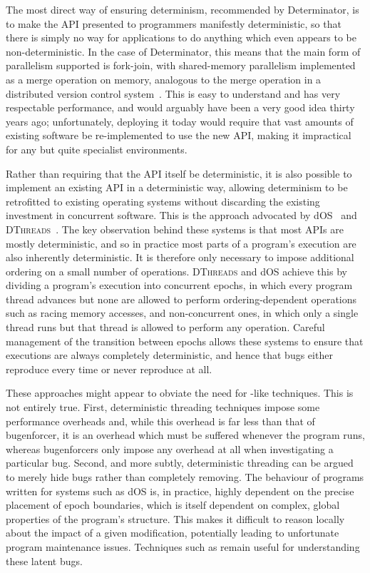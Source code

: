 The most direct way of ensuring determinism, recommended by
Determinator, is to make the API presented to programmers manifestly
deterministic, so that there is simply no way for applications to do
anything which even appears to be non-deterministic.  In the case of
Determinator, this means that the main form of parallelism supported
is fork-join, with shared-memory parallelism implemented as a merge
operation on memory, analogous to the merge operation in a distributed
version control system~\cite{Hamano2013}.  This is easy to understand
and has very respectable performance, and would arguably have been a
very good idea thirty years ago; unfortunately, deploying it today
would require that vast amounts of existing software be re-implemented
to use the new API, making it impractical for any but quite specialist
environments.

Rather than requiring that the API itself be deterministic, it is also
possible to implement an existing API in a deterministic way, allowing
determinism to be retrofitted to existing operating systems without
discarding the existing investment in concurrent software.  This is
the approach advocated by dOS~\cite{Bergan2010} and
\textsc{DThreads}~\cite{Liu2011}.  The key observation behind these
systems is that most APIs are mostly deterministic, and so in practice
most parts of a program's execution are also inherently deterministic.
It is therefore only necessary to impose additional ordering on a
small number of operations.  \textsc{DThreads} and dOS achieve this by
dividing a program's execution into concurrent epochs, in which every
program thread advances but none are allowed to perform
ordering-dependent operations such as racing memory accesses, and
non-concurrent ones, in which only a single thread runs but that
thread is allowed to perform any operation.  Careful management of the
transition between epochs allows these systems to ensure that
executions are always completely deterministic, and hence that bugs
either reproduce every time or never reproduce at all.

These approaches might appear to obviate the need for
{\technique}-like techniques.  This is not entirely true.  First,
deterministic threading techniques impose some performance overheads
and, while this overhead is far less than that of {\atechnique}
\gls{bugenforcer}, it is an overhead which must be suffered whenever
the program runs, whereas \glspl{bugenforcer} only impose any overhead
at all when investigating a particular bug.  Second, and more subtly,
deterministic threading can be argued to merely hide bugs rather than
completely removing.  The behaviour of programs written for systems
such as dOS is, in practice, highly dependent on the precise placement
of epoch boundaries, which is itself dependent on complex, global
properties of the program's structure.  This makes it difficult to
reason locally about the impact of a given modification, potentially
leading to unfortunate program maintenance issues.  Techniques such as
{\technique} remain useful for understanding these latent bugs.

